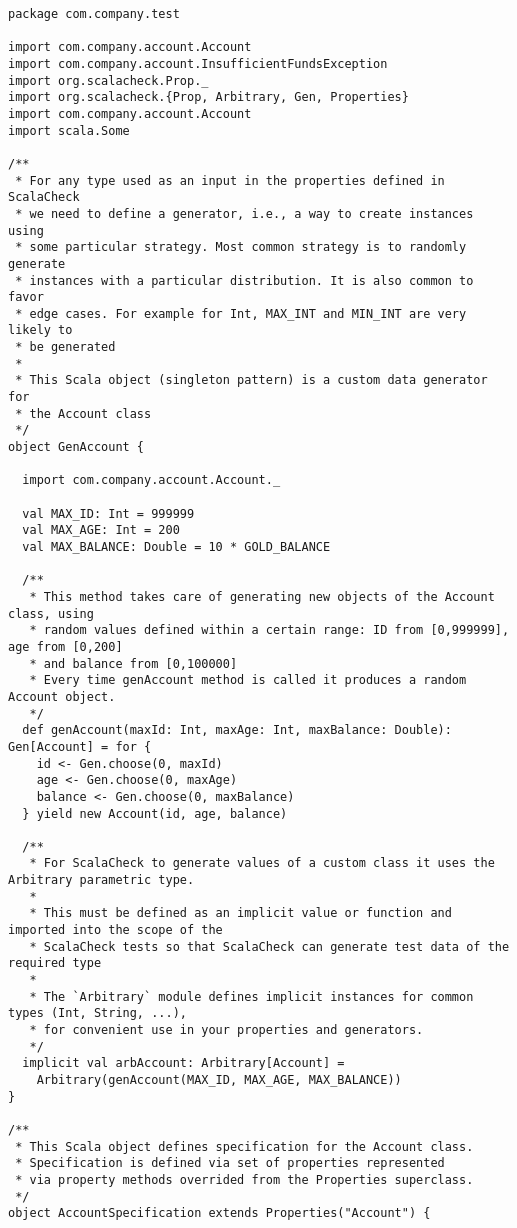 \documentclass{article}
\begin{document}
\begin{lstlisting}
package com.company.test

import com.company.account.Account
import com.company.account.InsufficientFundsException
import org.scalacheck.Prop._
import org.scalacheck.{Prop, Arbitrary, Gen, Properties}
import com.company.account.Account
import scala.Some

/**
 * For any type used as an input in the properties defined in ScalaCheck
 * we need to define a generator, i.e., a way to create instances using 
 * some particular strategy. Most common strategy is to randomly generate 
 * instances with a particular distribution. It is also common to favor 
 * edge cases. For example for Int, MAX_INT and MIN_INT are very likely to
 * be generated
 * 
 * This Scala object (singleton pattern) is a custom data generator for 
 * the Account class
 */
object GenAccount {

  import com.company.account.Account._

  val MAX_ID: Int = 999999
  val MAX_AGE: Int = 200
  val MAX_BALANCE: Double = 10 * GOLD_BALANCE

  /**
   * This method takes care of generating new objects of the Account class, using
   * random values defined within a certain range: ID from [0,999999], age from [0,200]
   * and balance from [0,100000]
   * Every time genAccount method is called it produces a random Account object.
   */
  def genAccount(maxId: Int, maxAge: Int, maxBalance: Double): Gen[Account] = for {
    id <- Gen.choose(0, maxId)
    age <- Gen.choose(0, maxAge)
    balance <- Gen.choose(0, maxBalance)
  } yield new Account(id, age, balance)

  /**
   * For ScalaCheck to generate values of a custom class it uses the Arbitrary parametric type.
   * 
   * This must be defined as an implicit value or function and imported into the scope of the 
   * ScalaCheck tests so that ScalaCheck can generate test data of the required type
   * 
   * The `Arbitrary` module defines implicit instances for common types (Int, String, ...), 
   * for convenient use in your properties and generators.
   */
  implicit val arbAccount: Arbitrary[Account] =
    Arbitrary(genAccount(MAX_ID, MAX_AGE, MAX_BALANCE))
}

/**
 * This Scala object defines specification for the Account class.
 * Specification is defined via set of properties represented 
 * via property methods overrided from the Properties superclass.
 */
object AccountSpecification extends Properties("Account") {


\end{lstlisting}
\end{document}
